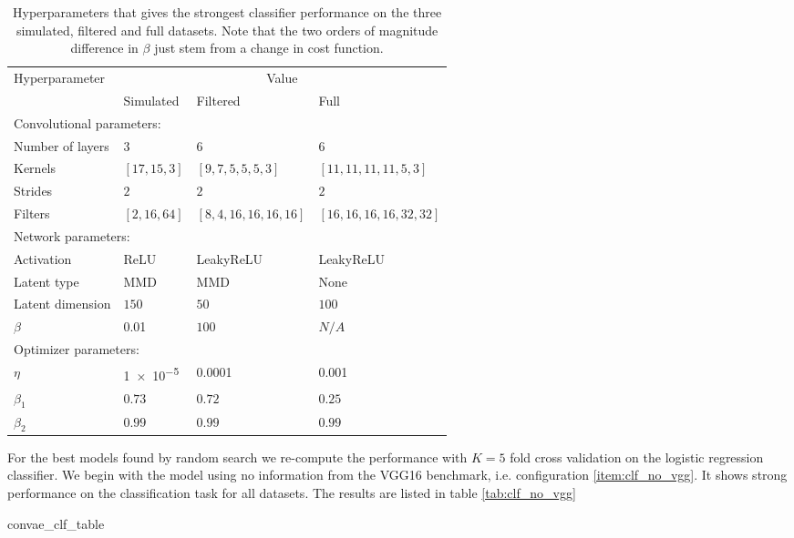 \begin{table}[ht]
\renewcommand*{\arraystretch}{0.7}
\centering
\caption{Hyperparameters that gives the strongest classifier performance on the three simulated, filtered and full datasets. Note that the two orders of magnitude difference in $\beta$ just stem from a change in cost function.}\label{tab:best_params_clf_convae}
\setlength{\extrarowheight}{15pt}
\hspace*{-0.5in}
\begin{tabular}{llll}
\toprule
Hyperparameter & \multicolumn{3}{c}{Value} \\
& Simulated & Filtered & Full \\
\midrule
\multicolumn{4}{l}{Convolutional parameters: } \\
\midrule
Number of layers & 3 & 6 & 6\\
Kernels & $[17, 15, 3]$ & $[9, 7, 5, 5, 5, 3]$ & $[11, 11, 11, 11, 5, 3]$ \\
Strides & $2$ & $2$ & $2$ \\
Filters & $[2, 16, 64]$ & $[8, 4, 16, 16, 16, 16]$ & $[16, 16, 16, 16, 32, 32]$ \\ 
\midrule
\multicolumn{4}{l}{Network parameters: } \\
\midrule
Activation & ReLU & LeakyReLU & LeakyReLU \\
Latent type & MMD & MMD & None \\
Latent dimension & $150$ & $50$ & $100$ \\
$\beta$ & \num{0.01} & $100$ & $ N/A $  \\
\midrule
\multicolumn{4}{l}{Optimizer parameters: } \\
\midrule
$\eta$ &  \num{1e-5} & \num{0.0001} & \num{0.001} \\
$\beta_1$ & $0.73$ & $0.72$ & $0.25$ \\
$\beta_2$ & $0.99$ & $0.99$ & $0.99$ \\
\bottomrule
\end{tabular}
\end{table}

For the best models found by random search we re-compute the performance with $K=5$ fold cross validation on the logistic regression classifier. We begin with the model using no information from the VGG16 benchmark, i.e. configuration \ref{item:clf_no_vgg}. It shows strong performance on the classification task for all datasets. The results are listed in table \ref{tab:clf_no_vgg}

\begin{table}
\centering
\caption{Logistic regression classification $f1$ scores using the \ref{item:clf_no_vgg} architecture. The standard error is reported from a $K=5$ fold cross validation of the logistic regression classifier.}\label{tab:clf_no_vgg}
{convae_clf_table}
\end{table}

